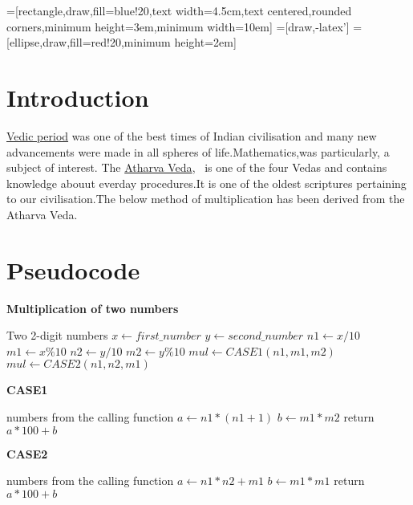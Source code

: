 \documentclass{article}
\begin{document}
\thispagestyle{fancy}
\fancyhf{}

=[rectangle,draw,fill=blue!20,text width=4.5cm,text centered,rounded corners,minimum height=3em,minimum width=10em]
=[draw,-latex']
=[ellipse,draw,fill=red!20,minimum height=2em]

\section{Introduction}
\href{https://en.wikipedia.org/wiki/Vedic_period}{Vedic period} was one of the best times of Indian civilisation and many new advancements were made in all spheres of life.Mathematics,was particularly, a subject of interest. The \href{https://en.wikipedia.org/wiki/Atharvaveda}{Atharva Veda},~\cite{Veda} is one of the four Vedas and contains knowledge abouut everday procedures.It is one of the oldest scriptures pertaining to our civilisation.The below method of multiplication has been derived from the Atharva Veda.~\cite{commentary}

\section{Pseudocode}
\label{pseudocode}
\begin{algorithm}
\caption{\large\textbf{Multiplication of two numbers}}
\begin{algorithmic}
\REQUIRE Two 2-digit numbers
\STATE $x \leftarrow first\_number$
\STATE $y \leftarrow second\_number$
\STATE $n1 \leftarrow x/10$
\STATE $m1 \leftarrow x\%10$
\STATE $n2 \leftarrow y/10$
\STATE $m2 \leftarrow y\%10$
	\STATE $mul \leftarrow CASE1(n1,m1,m2)$
\ENDIF
{}
	\STATE $mul \leftarrow CASE2(n1,n2,m1)$
\ENDIF
\end{algorithmic}
\end{algorithm}

\begin{algorithm}
\caption{\large\textbf{CASE1}}
\begin{algorithmic}
\label{case1}
 numbers from the calling function
\STATE $a \leftarrow n1*(n1+1)$
\STATE $b \leftarrow m1*m2$
\STATE return $a*100+b$
\end{algorithmic}
\end{algorithm}

\begin{algorithm}
\caption{\large\textbf{CASE2}}
\begin{algorithmic}
\label{case2}
 numbers from the calling function
\STATE $a \leftarrow n1*n2+m1$
\STATE $b \leftarrow m1*m1$
\STATE return $a*100+b$
\end{algorithmic}
\end{algorithm}
\end{document}
